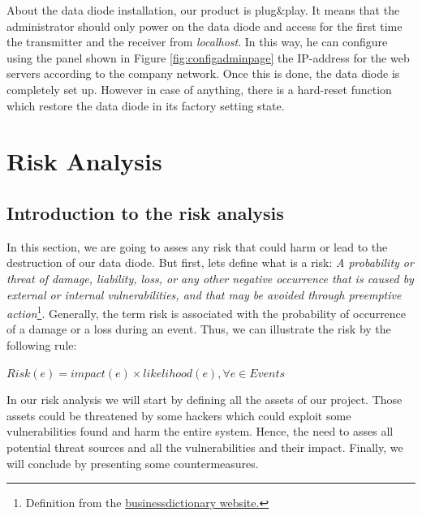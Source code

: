 \documentclass[a4paper,10pt]{article}
\begin{document}
About the data diode installation, our product is plug\&play. It means that the administrator should only power on the data diode and access for the first time the transmitter and the receiver from \emph{localhost}. In this way, he can configure using the panel shown in Figure \ref{fig:configadminpage} the IP-address for the web servers according to the company network. Once this is done, the data diode is completely set up. However in case of anything, there is a hard-reset function which restore the data diode in its factory setting state. 
\newpage
\section{Risk Analysis}

\subsection{Introduction to the risk analysis}
In this section, we are going to asses any risk that could harm or lead to the destruction of our data diode. But first, lets define what is a risk: \emph{A probability or threat of damage, liability, loss, or any other negative occurrence that is caused by external or internal vulnerabilities, and that may be avoided through preemptive action}\footnote{Definition from the \href{http://www.businessdictionary.com/definition/risk.html}{businessdictionary website.}}. Generally, the term risk is associated with the probability of occurrence of a damage or a loss during an event. Thus, we can illustrate the risk by the following rule:
\begin{center}
\centering
$Risk(e)= impact(e) \times likelihood(e), \forall e \in Events$
\end{center}

In our risk analysis we will start by defining all the assets of our project. Those assets could be threatened by some hackers which could exploit some vulnerabilities found and harm the entire system. Hence, the need to asses all potential threat sources and all the vulnerabilities and their impact. Finally, we will conclude by presenting some countermeasures.
\end{document}
